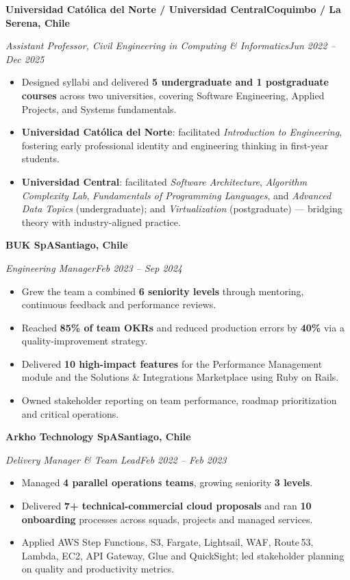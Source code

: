 \documentclass[11pt,a4paper]{article}
\newcommand{\entry}[4]{%
  \textbf{#1}\hfill\textbf{#2}\par
  \textit{#3}\hfill\textit{#4}\par\vspace{2pt}%
}
\begin{document}
\entry{Universidad Cat\'olica del Norte / Universidad Central}{Coquimbo / La Serena, Chile}{Assistant Professor, Civil Engineering in Computing \& Informatics}{Jun 2022 -- Dec 2025}
\begin{itemize}
  \item Designed syllabi and delivered \textbf{5 undergraduate and 1 postgraduate courses} across two universities, covering Software Engineering, Applied Projects, and Systems fundamentals.
  \item \textbf{Universidad Cat\'olica del Norte}: facilitated \textit{Introduction to Engineering}, fostering early professional identity and engineering thinking in first-year students.
  \item \textbf{Universidad Central}: facilitated \textit{Software Architecture}, \textit{Algorithm Complexity Lab}, \textit{Fundamentals of Programming Languages}, and \textit{Advanced Data Topics} (undergraduate); and \textit{Virtualization} (postgraduate) --- bridging theory with industry-aligned practice.
\end{itemize}

\entry{BUK SpA}{Santiago, Chile}{Engineering Manager}{Feb 2023 -- Sep 2024}
\begin{itemize}
  \item Grew the team a combined \textbf{6 seniority levels} through mentoring, continuous feedback
        and performance reviews.
  \item Reached \textbf{85\% of team OKRs} and reduced production errors by \textbf{40\%} via a
        quality-improvement strategy.
  \item Delivered \textbf{10 high-impact features} for the Performance Management module and the
        Solutions \& Integrations Marketplace using Ruby on Rails.
  \item Owned stakeholder reporting on team performance, roadmap prioritization and critical operations.
\end{itemize}

\entry{Arkho Technology SpA}{Santiago, Chile}{Delivery Manager \& Team Lead}{Feb 2022 -- Feb 2023}
\begin{itemize}
  \item Managed \textbf{4 parallel operations teams}, growing seniority \textbf{3 levels}.
  \item Delivered \textbf{7+ technical-commercial cloud proposals} and ran \textbf{10 onboarding}
        processes across squads, projects and managed services.
  \item Applied AWS Step Functions, S3, Fargate, Lightsail, WAF, Route\,53, Lambda, EC2, API Gateway,
        Glue and QuickSight; led stakeholder planning on quality and productivity metrics.
\end{itemize}
\end{document}
